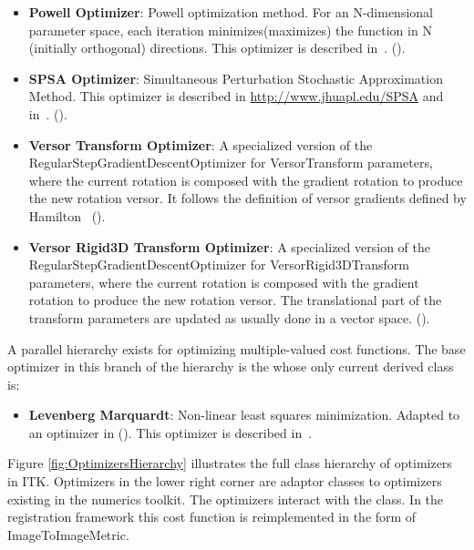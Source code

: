 \begin{itemize}
\item \textbf{Powell Optimizer}: Powell optimization method.  For an
N-dimensional parameter space, each iteration minimizes(maximizes) the function
in N (initially orthogonal) directions. This optimizer is described
in~\cite{Press1992}.  ().

\item \textbf{SPSA Optimizer}: Simultaneous Perturbation Stochastic
Approximation Method. This optimizer is described in
\url{http://www.jhuapl.edu/SPSA} and in~\cite{Spall1998}.
().

\item \textbf{Versor Transform Optimizer}: A specialized version of the
RegularStepGradientDescentOptimizer for VersorTransform
parameters, where the current rotation is composed with the gradient rotation
to produce the new rotation versor. It follows the definition of versor
gradients defined by Hamilton~\cite{Hamilton1866}
().

\item \textbf{Versor Rigid3D Transform Optimizer}: A specialized version of the
RegularStepGradientDescentOptimizer for VersorRigid3DTransform parameters,
where the current rotation is composed with the gradient rotation to produce
the new rotation versor. The translational part of the transform parameters are
updated as usually done in a vector space.
().


\end{itemize}

A parallel hierarchy exists for optimizing multiple-valued cost functions. The
base optimizer in this branch of the hierarchy is the
 whose only current derived class
is:

\begin{itemize}

\item \textbf{Levenberg Marquardt}: Non-linear least squares minimization.
Adapted to an optimizer in  ().
This optimizer is described in~\cite{Press1992}.

\end{itemize}


Figure \ref{fig:OptimizersHierarchy} illustrates the full class hierarchy of
optimizers in ITK. Optimizers in the lower right corner are adaptor classes
to optimizers existing in the  numerics toolkit. The optimizers
interact with the  class. In the registration framework
this cost function is reimplemented in the form of ImageToImageMetric.





